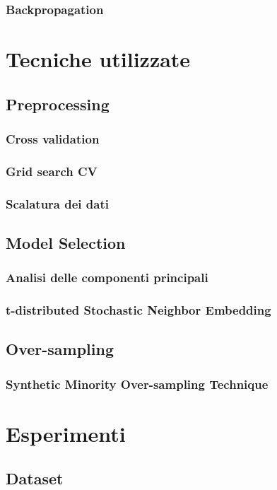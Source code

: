 \documentclass[12pt, twoside, letterpaper]{report}
\begin{document}
			\subsection{Backpropagation}
				
				
	\chapter{Tecniche utilizzate}
		\section{Preprocessing}
			\subsection{Cross validation}
			\subsection{Grid search CV}
			\subsection{Scalatura dei dati}
		\section{Model Selection}			
			\subsection{Analisi delle componenti principali}
			\subsection{t-distributed Stochastic Neighbor Embedding}
		\section{Over-sampling}
			\subsection{Synthetic Minority Over-sampling Technique}
		
	\chapter{Esperimenti}
		\section{Dataset}
\end{document}
